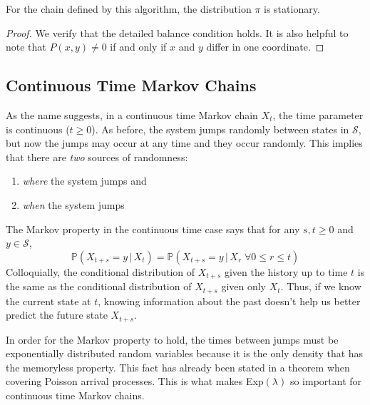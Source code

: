     \begin{proposition}
      For the chain defined by this algorithm, the distribution $\pi$ is stationary. 
    \end{proposition}
    \begin{proof}
      We verify that the detailed balance condition holds. It is also helpful to note that $P(x, y) \neq 0$ if and only if $x$ and $y$ differ in one coordinate. 
    \end{proof}

\subsection{Continuous Time Markov Chains}

  As the name suggests, in a continuous time Markov chain $X_t$, the time parameter is continuous ($t \geq 0$). As before, the system jumps randomly between states in $\mathcal{S}$, but now the jumps may occur at any time and they occur randomly. This implies that there are \textit{two} sources of randomness:
  \begin{enumerate}
    \item \textit{where} the system jumps and 
    \item \textit{when} the system jumps
  \end{enumerate}

  \begin{definition}
    The Markov property in the continuous time case says that for any $s, t \geq 0$ and $y \in \mathcal{S}$, 
    \begin{equation}
      \mathbb{P}(X_{t + s} = y \, | \, X_t) = \mathbb{P}(X_{t+s} = y \, | \, X_r \; \forall 0 \leq r \leq t)
    \end{equation}
    Colloquially, the conditional distribution of $X_{t+s}$ given the history up to time $t$ is the same as the conditional distribution of $X_{t+s}$ given only $X_t$. Thus, if we know the current state at $t$, knowing information about the past doesn't help us better predict the future state $X_{t+s}$. 

    In order for the Markov property to hold, the times between jumps must be exponentially distributed random variables because it is the only density that has the memoryless property. This fact has already been stated in a theorem when covering Poisson arrival processes. This is what makes Exp$(\lambda)$ so important for continuous time Markov chains. 
  \end{definition}

